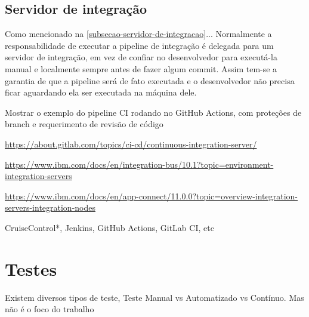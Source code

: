 \subsection{Servidor de integração}
Como mencionado na \autoref{subsecao-servidor-de-integracao}... Normalmente a responsabilidade de executar a pipeline de integração é delegada para um servidor de integração, em vez de confiar no desenvolvedor para executá-la manual e localmente sempre antes de fazer algum commit. Assim tem-se a garantia de que a pipeline será de fato executada e o desenvolvedor não precisa ficar aguardando ela ser executada na máquina dele.

Mostrar o exemplo do pipeline CI rodando no GitHub Actions, com proteções de branch e requerimento de revisão de código

\url{https://about.gitlab.com/topics/ci-cd/continuous-integration-server/}

\url{https://www.ibm.com/docs/en/integration-bus/10.1?topic=environment-integration-servers}

\url{https://www.ibm.com/docs/en/app-connect/11.0.0?topic=overview-integration-servers-integration-nodes}

CruiseControl*, Jenkins, GitHub Actions, GitLab CI, etc


\section{Testes}
Existem diversos tipos de teste, Teste Manual vs Automatizado vs Contínuo. Mas não é o foco do trabalho

